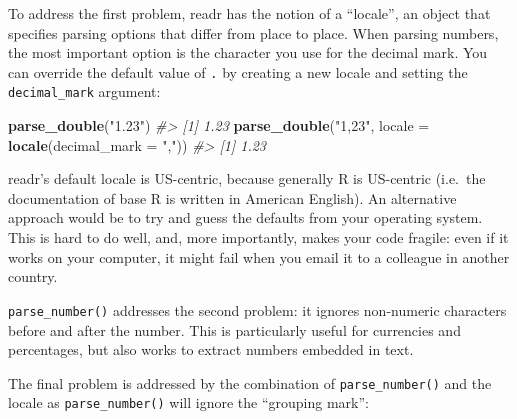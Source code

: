 \documentclass[]{book}
\newenvironment{Shaded}{\begin{snugshade}}{\end{snugshade}}
\newcommand{\KeywordTok}[1]{\textcolor[rgb]{0.13,0.29,0.53}{\textbf{{#1}}}}
\newcommand{\DataTypeTok}[1]{\textcolor[rgb]{0.13,0.29,0.53}{{#1}}}
\newcommand{\StringTok}[1]{\textcolor[rgb]{0.31,0.60,0.02}{{#1}}}
\newcommand{\CommentTok}[1]{\textcolor[rgb]{0.56,0.35,0.01}{\textit{{#1}}}}
\newcommand{\NormalTok}[1]{{#1}}
\begin{document}
To address the first problem, readr has the notion of a ``locale'', an
object that specifies parsing options that differ from place to place.
When parsing numbers, the most important option is the character you use
for the decimal mark. You can override the default value of \texttt{.}
by creating a new locale and setting the \texttt{decimal\_mark}
argument:

\begin{Shaded}
\begin{Highlighting}[]
\KeywordTok{parse_double}\NormalTok{(}\StringTok{"1.23"}\NormalTok{)}
\CommentTok{#> [1] 1.23}
\KeywordTok{parse_double}\NormalTok{(}\StringTok{"1,23"}\NormalTok{, }\DataTypeTok{locale =} \KeywordTok{locale}\NormalTok{(}\DataTypeTok{decimal_mark =} \StringTok{","}\NormalTok{))}
\CommentTok{#> [1] 1.23}
\end{Highlighting}
\end{Shaded}

readr's default locale is US-centric, because generally R is US-centric
(i.e.~the documentation of base R is written in American English). An
alternative approach would be to try and guess the defaults from your
operating system. This is hard to do well, and, more importantly, makes
your code fragile: even if it works on your computer, it might fail when
you email it to a colleague in another country.

\texttt{parse\_number()} addresses the second problem: it ignores
non-numeric characters before and after the number. This is particularly
useful for currencies and percentages, but also works to extract numbers
embedded in text.

\begin{Shaded}
\end{Shaded}

The final problem is addressed by the combination of
\texttt{parse\_number()} and the locale as \texttt{parse\_number()} will
ignore the ``grouping mark'':
\end{document}
